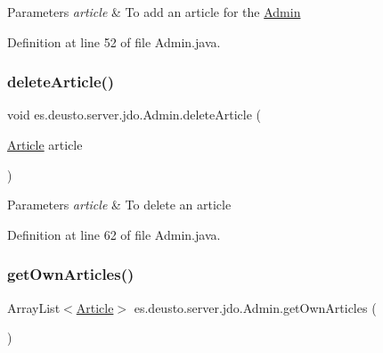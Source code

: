 \begin{DoxyParams}{Parameters}
{\em article} & To add an article for the \hyperlink{classes_1_1deusto_1_1server_1_1jdo_1_1_admin}{Admin} \\
\hline
\end{DoxyParams}


Definition at line 52 of file Admin.\+java.

\mbox{\label{classes_1_1deusto_1_1server_1_1jdo_1_1_admin_a059fd0608e09ed77ed52bf31b54734e0}} 
\subsubsection{\texorpdfstring{delete\+Article()}{deleteArticle()}}
{\footnotesize\ttfamily void es.\+deusto.\+server.\+jdo.\+Admin.\+delete\+Article (\begin{DoxyParamCaption}\item[{\hyperlink{classes_1_1deusto_1_1server_1_1jdo_1_1_article}{Article}}]{article }\end{DoxyParamCaption})}


\begin{DoxyParams}{Parameters}
{\em article} & To delete an article \\
\hline
\end{DoxyParams}


Definition at line 62 of file Admin.\+java.

\mbox{\label{classes_1_1deusto_1_1server_1_1jdo_1_1_admin_a26e6fdf7339157c66b276bc20fdeca3c}} 
\subsubsection{\texorpdfstring{get\+Own\+Articles()}{getOwnArticles()}}
{\footnotesize\ttfamily Array\+List$<$\hyperlink{classes_1_1deusto_1_1server_1_1jdo_1_1_article}{Article}$>$ es.\+deusto.\+server.\+jdo.\+Admin.\+get\+Own\+Articles (\begin{DoxyParamCaption}{ }\end{DoxyParamCaption})}

